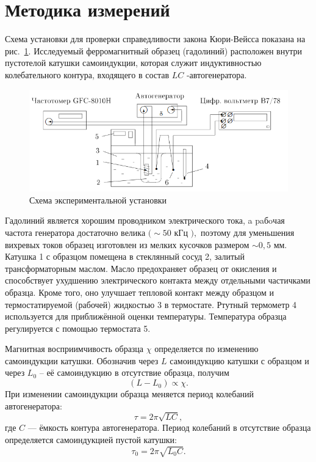 \documentclass[a4paper, 12pt]{article}
\begin{document}
\section{Методика измерений}

Схема установки для проверки справедливости закона Кюри-Вейсса показана на рис.~\ref{ris1}. Исследуемый ферромагнитный образец (гадолиний) расположен внутри пустотелой катушки самоиндукции, которая служит индуктивностью колебательного контура, входящего в состав $L C$ -автогенератора.

\begin{figure}[h!]
\begin{center}
    \includegraphics[scale=0.8]{1.png}
\end{center}
\caption{Схема экспериментальной установки}
\label{ris1}
\end{figure}

Гадолиний является хорошим проводником электрического тока, a paбoчая частота генератора достаточно велика $(\sim 50$ кГц $),$ поэтому для уменьшения вихревых токов образец изготовлен из мелких кусочков размером $\sim 0,5$ мм. Катушка 1 с образцом помещена в стеклянный сосуд 2, залитый трансформаторным маслом. Масло предохраняет образец от окисления и способствует ухудшению электрического контакта между отдельными частичками образца. Кроме того, оно улучшает тепловой контакт между образцом и термостатируемой (рабочей) жидкостью 3 в термостате. Ртутный термометр 4 используется для приближённой оценки температуры. Температура образца регулируется с помощью термостата 5.

Магнитная восприимчивость образца $\chi$ определяется по изменению самоиндукции катушки. Обозначив через $L$ самоиндукцию катушки с образцом и через $L_0$ -- её самоиндукцию в отсутствие образца, получим
\begin{equation*}
	(L-L_0)\propto \chi.
\end{equation*}
При изменении самоиндукции образца меняется период колебаний автогенератора:
\begin{equation*}
	\tau = 2\pi \sqrt{LC},
\end{equation*}
где $C$ --- ёмкость контура автогенератора. Период колебаний в отсутствие образца определяется самоиндукцией пустой катушки:
\begin{equation*}
	\tau_0 = 2\pi \sqrt{L_0C}.
\end{equation*}
\end{document}
